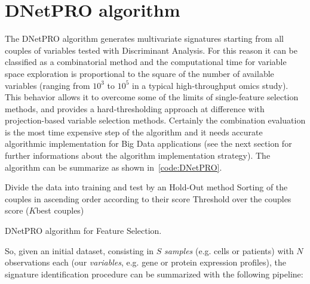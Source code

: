 \documentclass{standalone}
\begin{document}
\section[DNetPRO algorithm]{DNetPRO algorithm}\label{DNetPRO}

The DNetPRO algorithm generates multivariate signatures starting from all couples of variables tested with Discriminant Analysis.
For this reason it can be classified as a combinatorial method and the computational time for variable space exploration is proportional to the square of the number of available variables (ranging from $10^3$ to $10^5$ in a typical high-throughput omics study).
This behavior allows it to overcome some of the limits of single-feature selection methods, and provides a hard-thresholding approach at difference with projection-based variable selection methods.
Certainly the combination evaluation is the most time expensive step of the algorithm and it needs accurate algorithmic implementation for Big Data applications (see the next section for further informations about the algorithm implementation strategy).
The algorithm can be summarize as shown in~\ref{code:DNetPRO}.

\begin{algorithm}[H]
  Divide the data into training and test by an Hold-Out method\;
  Sorting of the couples in ascending order according to their score\;
  Threshold over the couples score ($K$best couples)\;
  \caption{DNetPRO algorithm for Feature Selection.}
  \label{code:DNetPRO}
\end{algorithm}

So, given an initial dataset, consisting in $S$ \emph{samples} (e.g. cells or patients) with $N$ observations each (our \emph{variables}, e.g. gene or protein expression profiles), the signature identification procedure can be summarized with the following pipeline:
\end{document}
